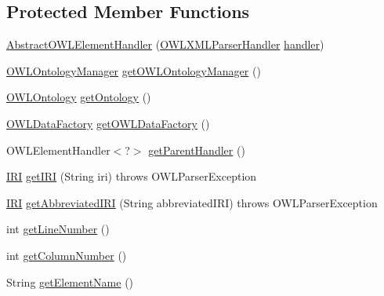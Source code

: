 \subsection*{Protected Member Functions}
\begin{DoxyCompactItemize}
\item 
\hyperlink{classorg_1_1coode_1_1owlapi_1_1owlxmlparser_1_1_abstract_o_w_l_element_handler_3_01_o_01_4_a883fa1c56d0c420ea9417478301886c2}{Abstract\-O\-W\-L\-Element\-Handler} (\hyperlink{classorg_1_1coode_1_1owlapi_1_1owlxmlparser_1_1_o_w_l_x_m_l_parser_handler}{O\-W\-L\-X\-M\-L\-Parser\-Handler} \hyperlink{classorg_1_1coode_1_1owlapi_1_1owlxmlparser_1_1_abstract_o_w_l_element_handler_3_01_o_01_4_a31af09b1e669cbfabf238feed83333e0}{handler})
\item 
\hyperlink{interfaceorg_1_1semanticweb_1_1owlapi_1_1model_1_1_o_w_l_ontology_manager}{O\-W\-L\-Ontology\-Manager} \hyperlink{classorg_1_1coode_1_1owlapi_1_1owlxmlparser_1_1_abstract_o_w_l_element_handler_3_01_o_01_4_a9fcb63daa12163d259d47aeb7ee48452}{get\-O\-W\-L\-Ontology\-Manager} ()
\item 
\hyperlink{interfaceorg_1_1semanticweb_1_1owlapi_1_1model_1_1_o_w_l_ontology}{O\-W\-L\-Ontology} \hyperlink{classorg_1_1coode_1_1owlapi_1_1owlxmlparser_1_1_abstract_o_w_l_element_handler_3_01_o_01_4_a2ca4897cb50d754b5973b8dada591573}{get\-Ontology} ()
\item 
\hyperlink{interfaceorg_1_1semanticweb_1_1owlapi_1_1model_1_1_o_w_l_data_factory}{O\-W\-L\-Data\-Factory} \hyperlink{classorg_1_1coode_1_1owlapi_1_1owlxmlparser_1_1_abstract_o_w_l_element_handler_3_01_o_01_4_a804f2bfc009c2c699e2e184c47c7158c}{get\-O\-W\-L\-Data\-Factory} ()
\item 
O\-W\-L\-Element\-Handler$<$?$>$ \hyperlink{classorg_1_1coode_1_1owlapi_1_1owlxmlparser_1_1_abstract_o_w_l_element_handler_3_01_o_01_4_a3e1161de1bc8d449d2217168b1e536a7}{get\-Parent\-Handler} ()
\item 
\hyperlink{classorg_1_1semanticweb_1_1owlapi_1_1model_1_1_i_r_i}{I\-R\-I} \hyperlink{classorg_1_1coode_1_1owlapi_1_1owlxmlparser_1_1_abstract_o_w_l_element_handler_3_01_o_01_4_a012fc4026fab53a1cf95487b97be3f40}{get\-I\-R\-I} (String iri)  throws O\-W\-L\-Parser\-Exception 
\item 
\hyperlink{classorg_1_1semanticweb_1_1owlapi_1_1model_1_1_i_r_i}{I\-R\-I} \hyperlink{classorg_1_1coode_1_1owlapi_1_1owlxmlparser_1_1_abstract_o_w_l_element_handler_3_01_o_01_4_ab44d882feb141788d7d4bf230f11debd}{get\-Abbreviated\-I\-R\-I} (String abbreviated\-I\-R\-I)  throws O\-W\-L\-Parser\-Exception 
\item 
int \hyperlink{classorg_1_1coode_1_1owlapi_1_1owlxmlparser_1_1_abstract_o_w_l_element_handler_3_01_o_01_4_a16087ee600416c4861e3329e39210b2a}{get\-Line\-Number} ()
\item 
int \hyperlink{classorg_1_1coode_1_1owlapi_1_1owlxmlparser_1_1_abstract_o_w_l_element_handler_3_01_o_01_4_a841453dae09ccb5e5d47798694f0a218}{get\-Column\-Number} ()
\item 
String \hyperlink{classorg_1_1coode_1_1owlapi_1_1owlxmlparser_1_1_abstract_o_w_l_element_handler_3_01_o_01_4_a8a24711bc957d37947452bbfcc3b2e9c}{get\-Element\-Name} ()
\end{DoxyCompactItemize}
